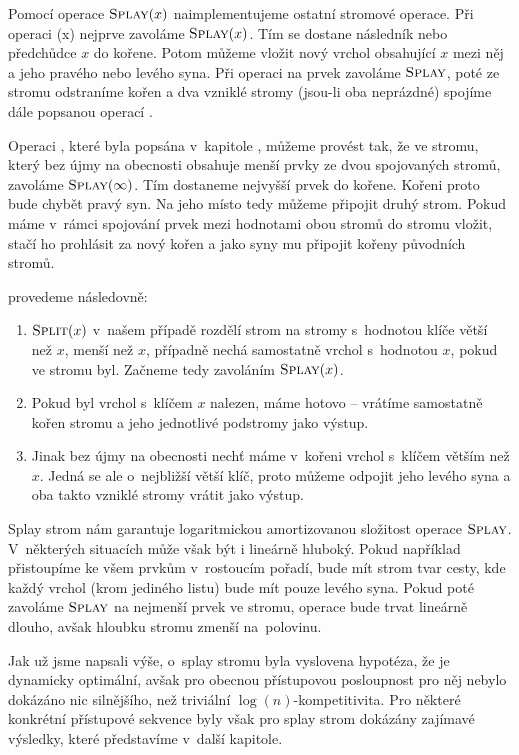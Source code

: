 Pomocí operace $\ope{Splay}(x)$ naimplementujeme ostatní stromové operace. Při
operaci (x) nejprve zavoláme $\ope{Splay}(x)$. Tím se dostane
následník nebo předchůdce $x$ do kořene. Potom můžeme vložit nový vrchol
obsahující $x$ mezi něj a jeho pravého nebo levého syna. Při operaci  na
prvek zavoláme $\ope{Splay}$, poté ze stromu odstraníme kořen a dva vzniklé
stromy (jsou-li oba neprázdné)  spojíme dále popsanou operací .

Operaci , které byla popsána v~kapitole , můžeme
provést tak, že ve stromu, který bez újmy na obecnosti obsahuje menší prvky ze
dvou spojovaných stromů, zavoláme $\ope{Splay}(\infty)$. Tím dostaneme nejvyšší
prvek do kořene. Kořeni proto bude chybět pravý syn. Na jeho místo tedy můžeme
připojit druhý strom. Pokud máme v~rámci spojování prvek mezi hodnotami obou
stromů do stromu vložit, stačí ho prohlásit za nový kořen a jako syny mu
připojit kořeny původních stromů. 

 provedeme následovně:

\begin{enumerate}
\item $\ope{Split}(x)$ v~našem případě rozdělí strom na stromy s~hodnotou klíče větší než $x$, menší než $x$, případně nechá samostatně vrchol s~hodnotou $x$, pokud ve stromu byl. Začneme tedy zavoláním $\ope{Splay}(x)$.
\item Pokud byl vrchol s~klíčem $x$ nalezen, máme hotovo -- vrátíme samostatně kořen stromu a jeho jednotlivé podstromy jako výstup.
\item Jinak bez újmy na obecnosti nechť máme v~kořeni vrchol s~klíčem větším než $x$. Jedná se ale o~nejbližší větší klíč, proto můžeme odpojit jeho levého syna a oba takto vzniklé stromy vrátit jako výstup.
\end{enumerate}

Splay strom nám garantuje logaritmickou amortizovanou složitost operace
$\ope{Splay}$. V~některých situacích může však být i lineárně hluboký. Pokud
například přistoupíme ke všem prvkům v~rostoucím pořadí, bude mít strom tvar
cesty, kde každý vrchol (krom jediného listu) bude mít pouze levého syna. Pokud
poté zavoláme $\ope{Splay}$ na nejmenší prvek ve stromu, operace bude trvat lineárně
dlouho, avšak hloubku stromu zmenší na~polovinu.

Jak už jsme napsali výše, o~splay stromu byla vyslovena hypotéza, že je
dynamicky optimální, avšak pro obecnou přístupovou posloupnost pro něj nebylo
dokázáno nic silnějšího, než triviální $\log(n)$-kompetitivita. Pro některé
konkrétní přístupové sekvence byly však pro splay strom dokázány zajímavé
výsledky, které                  představíme v~další kapitole.

